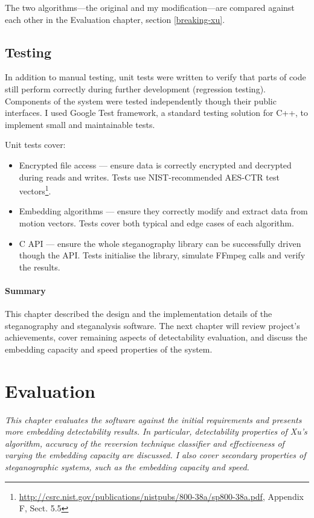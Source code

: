 \documentclass[12pt,british,twoside,notitlepage,usenames,dvipsnames,hypens,final]{report}
\numberwithin{equation}{section}
\numberwithin{figure}{section}
\begin{document}
The two algorithms---the original and my modification---are compared against each other in the Evaluation chapter, section \ref{breaking-xu}.

\section{Testing}

In addition to manual testing, unit tests were written to verify that parts of code  still perform correctly during further development (regression testing). Components of the system were tested independently though their public interfaces. I used Google Test framework, a standard testing solution for C++, to implement small and maintainable tests.

Unit tests cover:
\begin{itemize}
\item Encrypted file access --- ensure data is correctly encrypted and decrypted during reads and writes. Tests use NIST-recommended AES-CTR test vectors\footnote{\url{http://csrc.nist.gov/publications/nistpubs/800-38a/sp800-38a.pdf}, Appendix F, Sect. 5.5}.
\item Embedding algorithms --- ensure they correctly modify and extract data from motion vectors. Tests cover both typical and edge cases of each algorithm.
\item C API --- ensure the whole steganography library can be successfully driven though the API. Tests initialise the library, simulate FFmpeg calls and verify the results. 
\end{itemize}

\bigskip\bigskip
\subsubsection*{Summary}
This chapter described the design and the implementation details of the steganography and steganalysis software. The next chapter will review project's achievements, cover remaining aspects of detectability evaluation, and discuss the embedding capacity and speed properties of the system. 

\cleardoublepage
\chapter{Evaluation}

\textit{This chapter evaluates the software against the initial requirements and presents more embedding detectability results. In particular, detectability properties of Xu's algorithm, accuracy of the reversion technique classifier and effectiveness of varying the embedding capacity are discussed. I also cover secondary properties of steganographic systems, such as the embedding capacity and speed.
}
\end{document}
